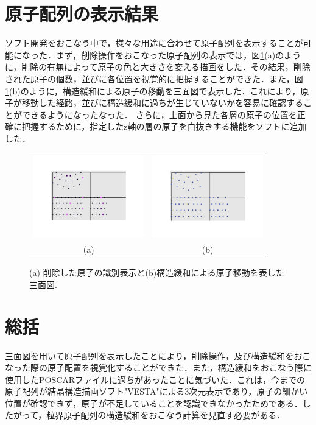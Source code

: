 \documentclass[a4j,twocolumn]{jsarticle}
\begin{document}
\section{原子配列の表示結果}
ソフト開発をおこなう中で，様々な用途に合わせて原子配列を表示することが可能になった．まず，削除操作をおこなった原子配列の表示では，図\ref{fig:two}(a)のように，削除の有無によって原子の色と大きさを変える描画をした．その結果，削除された原子の個数，並びに各位置を視覚的に把握することができた．また，図\ref{fig:two}(b)のように，構造緩和による原子の移動を三面図で表示した．これにより，原子が移動した経路，並びに構造緩和に過ちが生じていないかを容易に確認することができるようになったなった． さらに，上面から見た各層の原子の位置を正確に把握するために，指定したz軸の層の原子を白抜きする機能をソフトに追加した．

\begin{figure}[h]
\begin{center}
\begin{tabular}{cc}
   \includegraphics[width=48mm]{deleted_atoms.jpg} &
   \includegraphics[width=48mm]{change_position.jpg} \\
   (a) & (b)
\end{tabular}
  \caption{(a) 削除した原子の識別表示と(b)構造緩和による原子移動を表した三面図.}
  \label{fig:two}
\end{center}
\end{figure}

\section{総括}
三面図を用いて原子配列を表示したことにより，削除操作，及び構造緩和をおこなった際の原子配置を視覚化することができた．また，構造緩和をおこなう際に使用したPOSCARファイルに過ちがあったことに気づいた．これは，今までの原子配列が結晶構造描画ソフト"VESTA"による3次元表示であり，原子の細かい位置が確認できず，原子が不足していることを認識できなかったためである．したがって，粒界原子配列の構造緩和をおこなう計算を見直す必要がある．
\end{document}
